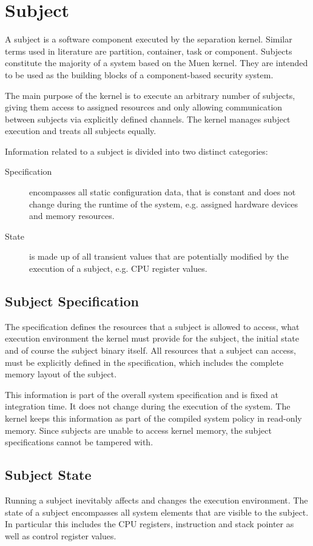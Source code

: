 \section{Subject}\label{sec:design-subject}
A subject is a software component executed by the separation kernel. Similar
terms used in literature are partition, container, task or component. Subjects
constitute the majority of a system based on the Muen kernel. They are intended
to be used as the building blocks of a component-based security system.

The main purpose of the kernel is to execute an arbitrary number of subjects,
giving them access to assigned resources and only allowing communication between
subjects via explicitly defined channels. The kernel manages subject execution
and treats all subjects equally.

Information related to a subject is divided into two distinct categories:

\begin{description}
	\item[Specification] encompasses all static configuration data, that is
		constant and does not change during the runtime of the system, e.g.
		assigned hardware devices and memory resources.
	\item[State] is made up of all transient values that are potentially
		modified by the execution of a subject, e.g. CPU register values.
\end{description}

\subsection{Subject Specification}
The specification defines the resources that a subject is allowed to access,
what execution environment the kernel must provide for the subject, the initial
state and of course the subject binary itself. All resources that a subject can
access, must be explicitly defined in the specification, which includes the
complete memory layout of the subject.

This information is part of the overall system specification and is fixed at
integration time. It does not change during the execution of the system. The
kernel keeps this information as part of the compiled system policy in read-only
memory. Since subjects are unable to access kernel memory, the subject
specifications cannot be tampered with.

\subsection{Subject State}
Running a subject inevitably affects and changes the execution environment. The
state of a subject encompasses all system elements that are visible to the
subject. In particular this includes the CPU registers, instruction and stack
pointer as well as control register values.


